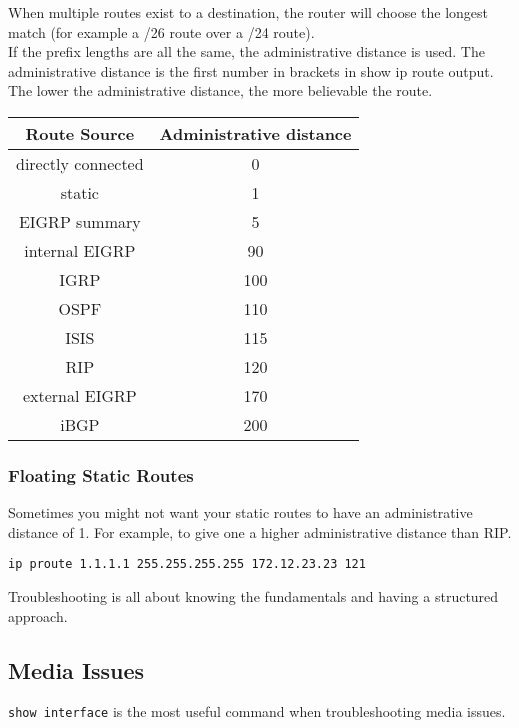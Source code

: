 When multiple routes exist to a destination, the router will choose the
longest match (for example a /26 route over a /24 route).\\

If the prefix lengths are all the same, the administrative distance is used.
The administrative distance is the first number in brackets in show ip route
output. The lower the administrative distance, the more believable the
route.\\

\begin{tabular}{ | c | c | }
\hline
Route Source & Administrative distance \\ \hline
directly connected &   0 \\ \hline
static             &   1 \\ \hline
EIGRP summary      &   5 \\ \hline
internal EIGRP     &  90 \\ \hline
IGRP               & 100 \\ \hline
OSPF               & 110 \\ \hline
ISIS               & 115 \\ \hline
RIP                & 120 \\ \hline
external EIGRP     & 170 \\ \hline
iBGP               & 200 \\ \hline
\end{tabular}

\subsubsection{Floating Static Routes}

Sometimes you might not want your static routes to have an administrative
distance of 1. For example, to give one a higher administrative distance than
RIP.

\begin{verbatim}
ip proute 1.1.1.1 255.255.255.255 172.12.23.23 121
\end{verbatim}

Troubleshooting is all about knowing the fundamentals and having a structured
approach.

\subsection{Media Issues}

\texttt{show interface} is the most useful command when troubleshooting media
issues.
